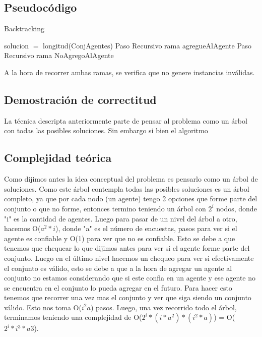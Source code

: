 \subsection{Pseudocódigo}

\begin{algorithm}[H]
\caption{Backtracking}\label{Ej1}

\begin{algorithmic}[H]
\State solucion $=$ longitud(ConjAgentes)
\EndIf
\EndIf
{}
\State Paso Recursivo rama agregueAlAgente
\EndIf
{}
\State Paso Recursivo rama NoAgregoAlAgente
\EndIf
\EndProcedure
\end{algorithmic}
\end{algorithm}

	A la hora de recorrer ambas ramas, se verifica que no genere instancias inválidas. 
\subsection{Demostración de correctitud}

	La técnica descripta anteriormente parte de pensar al problema como un árbol con todas las posibles soluciones. Sin embargo si bien el algoritmo 

\subsection{Complejidad teórica}
	
	Como dijimos antes la idea conceptual del problema es pensarlo como un árbol de soluciones. Como este árbol contempla todas las posibles soluciones es un árbol completo, ya que por cada nodo (un agente) tengo 2 opciones que forme parte del conjunto o que no forme, entonces termino teniendo un árbol con $2^{i}$ nodos, donde "i" es la cantidad de agentes. Luego para pasar de un nivel del árbol a otro, hacemos O($a^{2}*i$), donde "a" es el número de encuestas, pasos para ver si el agente es confiable y O(1) para ver que no es confiable. Esto se debe a que tenemos que chequear lo que dijimos antes para ver si el agente forme parte del conjunto. Luego en el último nivel hacemos un chequeo para ver si efectivamente el conjunto es válido, esto se debe a que a la hora de agregar un agente al conjunto no estamos considerando que si este confia en un agente y ese agente no se encuentra en el conjunto lo pueda agregar en el futuro. Para hacer esto tenemos que recorrer una vez mas el conjunto y ver que siga siendo un conjunto válido. Esto nos toma O($i^{2}a$) pasos. Luego, una vez recorrido todo el árbol, terminamos teniendo una complejidad de O($2^{i}*(i*a^{2})*(i^{2}*a)$) = O($2^{i}*i^{3}*a{3}$).
	
